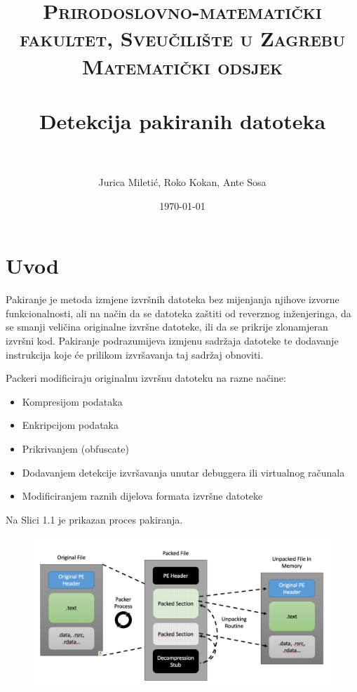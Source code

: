 \documentclass[paper=a4, fontsize=11pt]{scrartcl} %
\title{	
\normalfont \normalsize 
\textsc{Prirodoslovno-matematički fakultet, Sveučilište u Zagrebu \\ Matematički odsjek} \\ [25pt] %
\horrule{0.5pt} \\[0.4cm] %
\huge Detekcija pakiranih datoteka \\ %
\horrule{2pt} \\[0.5cm] %
}
\author{Jurica Miletić, Roko Kokan, Ante Sosa} %
\date{\normalsize\today} %
\numberwithin{equation}{section} %
\numberwithin{figure}{section} %
\numberwithin{table}{section} %
\begin{document}
\maketitle %


\section{Uvod}

Pakiranje je metoda izmjene izvršnih datoteka bez mijenjanja njihove izvorne funkcionalnosti,
ali na način da se datoteka zaštiti od reverznog inženjeringa, da se smanji veličina originalne
izvršne datoteke, ili da se prikrije zlonamjeran izvršni kod. Pakiranje podrazumijeva izmjenu
sadržaja datoteke te dodavanje instrukcija koje će prilikom izvršavanja taj sadržaj obnoviti.

\vspace{2.5mm}
Packeri modificiraju originalnu izvršnu datoteku na razne načine:
\begin{itemize}
\item Kompresijom podataka
\item Enkripcijom podataka
\item  Prikrivanjem (obfuscate)
\item  Dodavanjem detekcije izvršavanja unutar debuggera ili virtualnog računala 
\item Modificiranjem raznih dijelova formata izvršne datoteke
\end{itemize}

Na Slici 1.1 je prikazan proces pakiranja. \\
\begin{figure}[ht]
\includegraphics[width=15cm]{Packers.png}
\caption{}
\centering
\end{figure}
\end{document}
